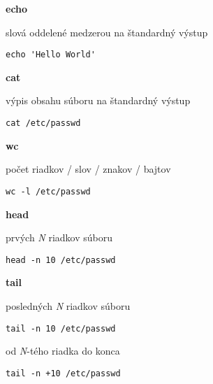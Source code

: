\documentclass[8pt,landscape]{extarticle}
\newcommand{\Heading}[1]{%
{\begin{center}\bfseries\Large#1\end{center}}%
}%
\newenvironment{karticka}[1]%
{%
\Heading{#1}%
}%
{%
\clearpage
}%
\begin{document}
\begin{karticka}{echo}
\begin{obsah}
slová oddelené medzerou na štandardný výstup
\end{obsah}
\begin{middlecolorbox}
\begin{Verbatim}
echo 'Hello World'
\end{Verbatim}
\end{middlecolorbox}
\end{karticka}
\begin{karticka}{cat}
\begin{obsah}
výpis obsahu súboru na štandardný výstup
\end{obsah}
\begin{middlecolorbox}
\begin{Verbatim}
cat /etc/passwd
\end{Verbatim}
\end{middlecolorbox}
\end{karticka}
\begin{karticka}{wc}
\begin{obsah}
počet riadkov / slov / znakov / bajtov
\end{obsah}
\begin{middlecolorbox}
\begin{Verbatim}
wc -l /etc/passwd
\end{Verbatim}
\end{middlecolorbox}
\end{karticka}
\begin{karticka}{head}
\begin{obsah}
prvých \emph{N} riadkov súboru
\end{obsah}
\begin{middlecolorbox}
\begin{Verbatim}
head -n 10 /etc/passwd
\end{Verbatim}
\end{middlecolorbox}
\end{karticka}
\begin{karticka}{tail}
\begin{obsah}
posledných \emph{N} riadkov súboru
\end{obsah}
\begin{middlecolorbox}
\begin{Verbatim}
tail -n 10 /etc/passwd
\end{Verbatim}
\end{middlecolorbox}
\begin{obsah}
od \emph{N}-tého riadka do konca
\end{obsah}
\begin{middlecolorbox}
\begin{Verbatim}
tail -n +10 /etc/passwd
\end{Verbatim}
\end{middlecolorbox}

\end{karticka}
\end{document}
